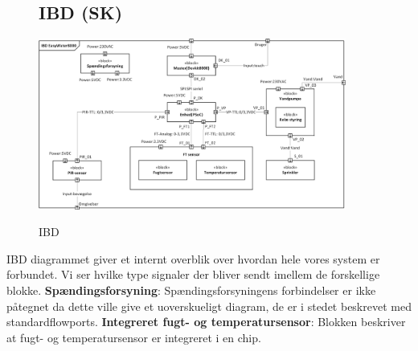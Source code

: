 \begin{figure}[H] \centering
\subsection{IBD (SK)}
{\includegraphics[width=0.9\textwidth]{filer/systemarkitektur/IBD}}
\caption{IBD}
\label{lab:ibd}
\raggedright
\end{figure}
IBD diagrammet giver et internt overblik over hvordan hele vores system er forbundet. Vi ser hvilke type signaler der bliver sendt imellem de forskellige blokke. \newline \newline
\textbf{Spændingsforsyning}: Spændingsforsyningens forbindelser er ikke påtegnet da dette ville give et uoverskueligt diagram, de er i stedet beskrevet med standardflowports.  \newline \newline
\textbf{Integreret fugt- og temperatursensor}: Blokken beskriver at fugt- og temperatursensor er integreret i en chip. \newline \newline


